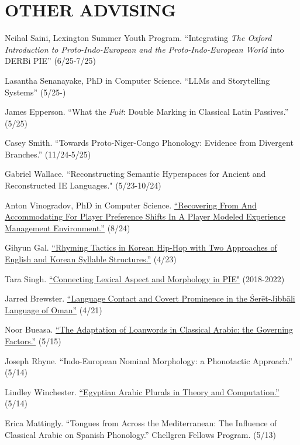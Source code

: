 \documentclass[paper=letter,fontsize=11pt]{scrartcl} %
\newcommand{\NewPart}[2]{\section*{\uppercase{#1} #2}}
\begin{document}
\NewPart{Other Advising}{}
\begin{etaremune}

\item Neihal Saini, Lexington Summer Youth Program. {``Integrating {\it The Oxford Introduction to Proto-Indo-European and the Proto-Indo-European World} into DERBi PIE''} (6/25-7/25)
\item Lasantha Senanayake, PhD in Computer Science. {``LLMs and Storytelling Systems''} (5/25-)
\item James Epperson. {``What the \textit{Fuit}: Double Marking in Classical 
Latin Passives.''} (5/25)
\item Casey Smith. {``Towards Proto-Niger-Congo Phonology: Evidence
from Divergent Branches.''} (11/24-5/25)
\item Gabriel Wallace. {``Reconstructing Semantic Hyperspaces for Ancient and Reconstructed IE Languages."} (5/23-10/24)
\item Anton Vinogradov, PhD in Computer Science. \href{https://uknowledge.uky.edu/cs_etds/145/}{``Recovering From And Accommodating For Player Preference Shifts In A Player Modeled Experience Management Environment.''} (8/24)
\item Gihyun Gal. \href{https://uknowledge.uky.edu/ltt_etds/54/}{``Rhyming Tactics in Korean Hip-Hop with Two Approaches of English and Korean
Syllable Structures.''} (4/23)
\item Tara Singh. {\href{https://docs.google.com/document/d/1xHEmuhhpM6MCgbzIsouXcADb8B-G9aEuPiX2yxnTHFQ/edit}{``Connecting Lexical Aspect and Morphology in PIE"}} (2018-2022)
\item Jarred Brewster. \href{https://uknowledge.uky.edu/ltt_etds/43/}{``Language Contact and Covert Prominence in the \'{S}er\={e}t-Jibb\={a}li Language of Oman''} (4/21)
\item Noor Bueasa. {\href{https://uknowledge.uky.edu/cgi/viewcontent.cgi?referer=https://www.google.com/&httpsredir=1&article=1006&context=ltt_etds}{“The Adaptation of Loanwords in Classical Arabic: the Governing Factors.”}} (5/15)
\item Joseph Rhyne.  “Indo-European Nominal Morphology: a Phonotactic Approach.” (5/14)
\item Lindley Winchester. {\href{https://uknowledge.uky.edu/ltt_etds/4/}{“Egyptian Arabic Plurals in Theory and Computation.”}} (5/14)
\item Erica Mattingly. “Tongues from Across the Mediterranean: The Influence of Classical Arabic on Spanish Phonology.” Chellgren Fellows Program. (5/13)
\end{etaremune}
\end{document}
